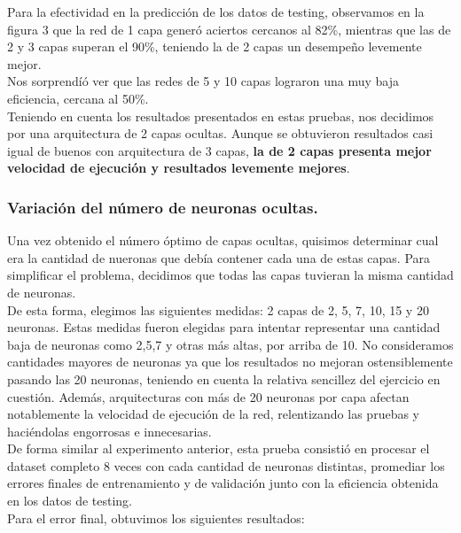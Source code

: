 Para la efectividad en la predicción de los datos de testing, observamos en la figura 3 que la red de 1 capa generó aciertos cercanos al 82\%, mientras que las de 2 y 3 capas superan el 90\%, teniendo la de 2 capas un desempeño levemente mejor.\\
Nos sorprendíó ver que las redes de 5 y 10 capas lograron una muy baja eficiencia, cercana al 50\%.\\

Teniendo en cuenta los resultados presentados en estas pruebas, nos decidimos por una arquitectura de 2 capas ocultas. Aunque se obtuvieron resultados casi igual de buenos con arquitectura de 3 capas, \textbf{la de 2 capas presenta mejor velocidad de ejecución y resultados levemente mejores}.\\

\newpage

\subsubsection{Variación del número de neuronas ocultas.}

Una vez obtenido el número óptimo de capas ocultas, quisimos determinar cual era la cantidad de nueronas que debía contener
cada una de estas capas. Para simplificar el problema, decidimos que todas las capas tuvieran la misma cantidad de neuronas.\\
De esta forma, elegimos las siguientes medidas: 2 capas de 2, 5, 7, 10, 15 y 20 neuronas. Estas medidas fueron elegidas para intentar representar una cantidad baja de neuronas como 2,5,7 y otras más altas, por arriba de 10. No consideramos cantidades mayores de neuronas ya que los resultados no mejoran ostensiblemente pasando las 20 neuronas, teniendo en cuenta la relativa
sencillez del ejercicio en cuestión. Además, arquitecturas con más de 20 neuronas por capa afectan notablemente la velocidad de ejecución de la red, relentizando las pruebas y haciéndolas engorrosas e innecesarias.\\

De forma similar al experimento anterior, esta prueba consistió en procesar el dataset completo 8 veces con cada cantidad de neuronas distintas, promediar los errores finales de entrenamiento y de validación junto con la eficiencia obtenida en los datos de testing.\\
Para el error final, obtuvimos los siguientes resultados:\\

